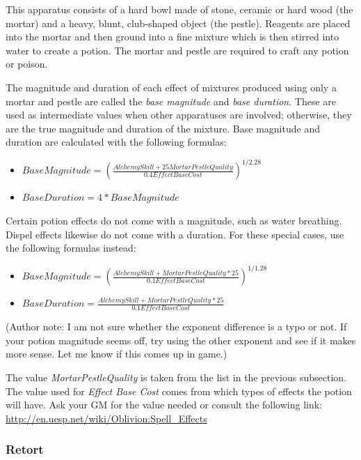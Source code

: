 \documentclass[12pt]{book}
\begin{document}
This apparatus consists of a hard bowl made of stone, ceramic or hard wood (the mortar) and a heavy, blunt, club-shaped object (the pestle). Reagents are placed into the mortar and then ground into a fine mixture which is then stirred into water to create a potion. The mortar and pestle are required to craft any potion or poison.

The magnitude and duration of each effect of mixtures produced using only a mortar and pestle are called the \textit{base magnitude} and \textit{base duration}. These are used as intermediate values when other apparatuses are involved; otherwise, they are the true magnitude and duration of the mixture. Base magnitude and duration are calculated with the following formulas:

\begin{itemize}
	\item $Base Magnitude=(\frac{Alchemy Skill+25MortarPestleQuality}{0.4EffectBaseCost})^{1/2.28}$
	\item $Base Duration=4*Base Magnitude$
\end{itemize}

Certain potion effects do not come with a magnitude, such as water breathing. Dispel effects likewise do not come with a duration. For these special cases, use the following formulas instead:

\begin{itemize}
	\item $Base Magnitude=(\frac{Alchemy Skill+MortarPestleQuality*25}{0.1EffectBaseCost})^{1/1.28}$
	\item $Base Duration=\frac{Alchemy Skill+MortarPestleQuality*25}{0.1EffectBaseCost}$
\end{itemize}

(Author note: I am not sure whether the exponent difference is a typo or not. If your potion magnitude seems off, try using the other exponent and see if it makes more sense. Let me know if this comes up in game.)

The value \textit{MortarPestleQuality} is taken from the list in the previous subsection. The value used for \textit{Effect Base Cost} comes from which types of effects the potion will have. Ask your GM for the value needed or consult the following link: \url{http://en.uesp.net/wiki/Oblivion:Spell_Effects}

\newpage
\subsubsection{Retort}
\end{document}
